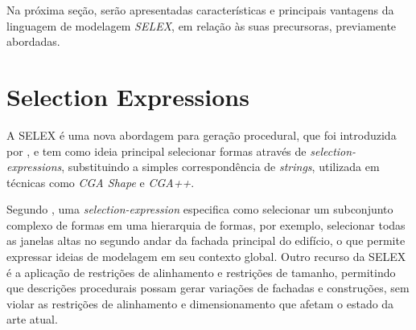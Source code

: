 \begin{figure}[h!]
	\centering
	\captionsetup{width=14cm}
	{}
\end{figure}

\vspace{1cm}

Na próxima seção, serão apresentadas características e principais vantagens da linguagem de modelagem \textit{SELEX}, em relação às suas precursoras, previamente abordadas.

\newpage

\section{Selection Expressions}
\label{sec:selex}

A \gls{SELEX} é uma nova abordagem para geração procedural, que foi introduzida por , e tem como ideia principal selecionar formas através de \textit{selection-expressions}, substituindo a simples correspondência de \textit{strings}, utilizada em técnicas como \textit{CGA Shape} e \textit{CGA++}. 

Segundo , uma \textit{selection-expression} especifica como selecionar um subconjunto complexo de formas em uma hierarquia de formas, por exemplo, selecionar todas as janelas altas no segundo andar da fachada principal do edifício, o que permite expressar ideias de modelagem em seu contexto global. Outro recurso da \gls{SELEX} é a aplicação de restrições de alinhamento e restrições de tamanho, permitindo que descrições procedurais possam gerar variações de fachadas e construções, sem violar as restrições de alinhamento e dimensionamento que afetam o estado da arte atual. 

